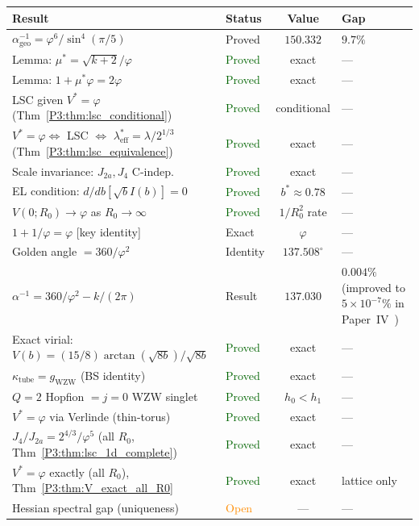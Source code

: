 \documentclass[11pt,a4paper]{article}
\theoremstyle{definition}
\theoremstyle{remark}
\newcommand{\vp}{\varphi}
\newcommand{\lam}{\lambda}
\newcommand{\leff}{\lambda_{\mathrm{eff}}}
\newcommand{\aInv}{\alpha^{-1}}
\begin{document}
\begin{center}
\renewcommand{\arraystretch}{1.4}
\begin{tabular}{llcp{3.5cm}}
\toprule
Result & Status & Value & Gap \\
\midrule
$\aInv_{\mathrm{geo}} = \vp^6/\sin^4(\pi/5)$ & Proved & $150.332$ & $9.7\%$ \\
Lemma: $\mu^* = \sqrt{k+2}/\vp$ & \textcolor{darkgreen}{Proved} & exact & --- \\
Lemma: $1+\mu^*\vp = 2\vp$ & \textcolor{darkgreen}{Proved} & exact & --- \\
LSC given $V^*=\vp$ (Thm~\ref{P3:thm:lsc_conditional}) & \textcolor{darkgreen}{Proved} & conditional & --- \\
$V^*=\vp \Leftrightarrow$ LSC $\Leftrightarrow$ $\leff^*=\lam/2^{1/3}$ (Thm~\ref{P3:thm:lsc_equivalence}) & \textcolor{darkgreen}{Proved} & exact & --- \\
Scale invariance: $J_{2a},J_4$ C-indep. & \textcolor{darkgreen}{Proved} & exact & --- \\
EL condition: $d/db[\sqrt{b}I(b)]=0$ & \textcolor{darkgreen}{Proved} & $b^*\!\approx 0.78$ & --- \\
$V(0;R_0)\to\vp$ as $R_0\to\infty$ & \textcolor{darkgreen}{Proved} & $1/R_0^2$ rate & --- \\
$1+1/\vp=\vp$ [key identity] & Exact & $\vp$ & --- \\
Golden angle $= 360/\vp^2$ & Identity & $137.508^\circ$ & --- \\
$\aInv = 360/\vp^2 - k/(2\pi)$ & Result & $137.030$ & $0.004\%$ (improved to $5\times10^{-7}\%$ in Paper~IV~\cite{Paper4}) \\
Exact virial: $V(b)=(15/8)\arctan(\sqrt{8b})/\sqrt{8b}$ & \textcolor{darkgreen}{Proved} & exact & --- \\
$\kappa_{\mathrm{tube}} = g_{\mathrm{WZW}}$ (BS identity) & \textcolor{darkgreen}{Proved} & exact & --- \\
$Q=2$ Hopfion $= j{=}0$ WZW singlet & \textcolor{darkgreen}{Proved} & $h_0{<}h_1$ & --- \\
$V^*=\vp$ via Verlinde (thin-torus) & \textcolor{darkgreen}{Proved} & exact & --- \\
$J_4/J_{2a}=2^{4/3}/\vp^5$ (all $R_0$, Thm~\ref{P3:thm:lsc_1d_complete}) & \textcolor{darkgreen}{Proved} & exact & --- \\
$V^*=\vp$ exactly (all $R_0$), Thm~\ref{P3:thm:V_exact_all_R0} & \textcolor{darkgreen}{Proved} & exact & lattice only \\
Hessian spectral gap (uniqueness) & \textcolor{darkorange}{Open} & --- & --- \\
\bottomrule
\end{tabular}
\end{center}
\end{document}
